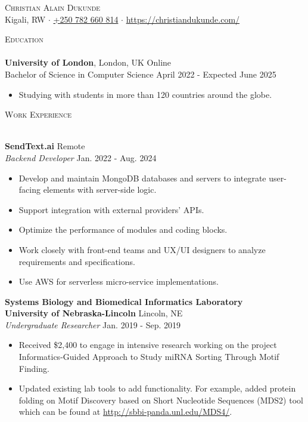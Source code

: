 \documentclass[a4paper]{article}
\newcommand{\lineunder} {
    \vspace*{-8pt} \\
    \hspace*{-18pt} \hrulefill \\
}
\newcommand{\header} [1] {
    {\hspace*{-18pt}\vspace*{6pt} \textsc{#1}}
    \vspace*{-6pt} \lineunder
}
\begin{document}
\vspace*{-40pt}

\vspace*{-10pt}
\begin{center}
	{\Huge \scshape {Christian Alain Dukunde}}\\
	Kigali, RW $\cdot$ \href{tel:+250782660814}{+250 782 660 814} $\cdot$ \url{https://christiandukunde.com/}\\
\end{center}

\header{Education}
\textbf{University of London}, London, UK Online\\
Bachelor of Science in Computer Science \hfill April 2022 - Expected June 2025\\
\begin{itemize} \itemsep 1pt
	\item Studying with students in more than 120 countries around the globe.
\end{itemize}
\vspace{2mm}

\header{Work Experience}
\vspace{1mm}

\textbf{SendText.ai} \hfill Remote\\
\textit{Backend Developer} \hfill Jan. 2022 - Aug. 2024\\
\vspace{-1mm}
\begin{itemize} \itemsep 1pt
	\item Develop and maintain MongoDB databases and servers to integrate user-facing elements with server-side logic.
	\item Support integration with external providers’ APIs.
	\item Optimize the performance of modules and coding blocks.
	\item Work closely with front-end teams and UX/UI designers to analyze requirements and specifications.
	\item Use AWS for serverless micro-service implementations.
\end{itemize}

\textbf{Systems Biology and Biomedical Informatics Laboratory\\ University of Nebraska-Lincoln} \hfill Lincoln, NE\\
\textit{Undergraduate Researcher} \hfill Jan. 2019 - Sep. 2019\\
\vspace{-1mm}
\begin{itemize} \itemsep 1pt
	\item Received \$2,400 to engage in intensive research working on the project \textquotedbl{}Informatics-Guided Approach to Study miRNA Sorting Through Motif Finding\textquotedbl{}.
	\item Updated existing lab tools to add functionality. For example, added protein folding on Motif Discovery based on Short Nucleotide Sequences (MDS2) tool which can be found at \url{http://sbbi-panda.unl.edu/MDS4/}.
\end{itemize}
\end{document}
